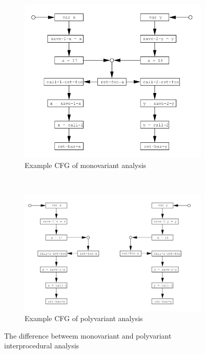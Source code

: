 \begin{figure}[H]

  \begin{subfigure}[b]{\textwidth}
    \centering
    \includegraphics[width=.6\textwidth]{figures/monovariant}
    \caption{Example CFG of monovariant analysis}
    \label{monovariant}
  \end{subfigure}
 ~ 
  \begin{subfigure}[b]{\textwidth}
    \centering
    \includegraphics[width=.7\textwidth]{figures/polyvariant}
    \caption{Example CFG of polyvariant analysis}
    \label{polyvariant}
  \end{subfigure}
  
  \caption{The difference betweem monovariant and polyvariant interprocedural analysis}
  \label{monopoly}
\end{figure}

